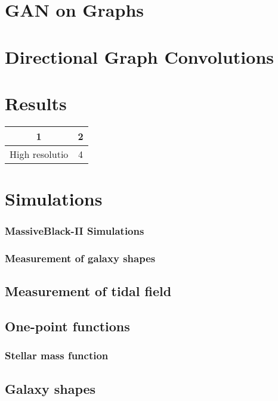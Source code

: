 \documentclass[a4paper,fleqn,usenatbib]{mnras}
\begin{document}
\section{GAN on Graphs}

\section{Directional Graph Convolutions}

\section{Results}
\begin{tabular}{|c|c|}
\hline 
1 & 2 \\ 
\hline 
High resolutio & 4 \\ 
\hline 
\end{tabular} 


\section{Simulations}

	\subsubsection{MassiveBlack-II Simulations}

	\subsubsection{Measurement of galaxy  shapes}

	\subsection{Measurement of tidal field}

\subsection{One-point functions}

	\subsubsection{Stellar mass function}

	\subsection{Galaxy shapes}
\end{document}
